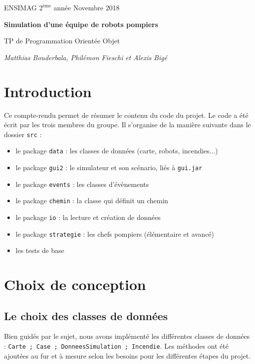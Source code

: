 \documentclass[12pt]{article}
\newcommand{\noi}{\noindent}
\begin{document}
\baselineskip7mm

\noi ENSIMAG $2^{\mbox{ème}}$ année   \hfill Novembre 2018


\vspace{1cm}


\begin{center}
{\Large \bf Simulation d'une équipe de robots pompiers

\vspace{3mm}

\normalsize TP de Programmation Orientée Objet

\vspace{3mm}
{\it \small Matthias Bouderbala, Philémon Fieschi et Alexis Bigé}
}
\end{center}

\section{Introduction}

Ce compte-rendu permet de résumer le contenu du code du projet. Le code a été écrit par les trois membres du groupe. Il s'organise de la manière suivante dans le dossier {\tt src} :
\begin{itemize}
  \item le package {\tt data} : les classes de données (carte, robots, incendies...)
  \item le package {\tt gui2} : le simulateur et son scénario, liés à {\tt gui.jar}
  \item le package {\tt events} : les classes d'évènements
  \item le package {\tt chemin} : la classe qui définit un chemin
  \item le package {\tt io} : la lecture et création de données
  \item le package {\tt strategie} : les chefs pompiers (élémentaire et avancé)
  \item les tests de base
\end{itemize}

\section{Choix de conception}

\subsection{Le choix des classes de données}
Bien guidés par le sujet, nous avons implémenté les différentes classes de données : {\tt Carte ; Case ; DonneesSimulation ; Incendie}. Les méthodes ont été ajoutées au fur et à mesure selon les besoins pour les différentes étapes du projet.\\
\end{document}
